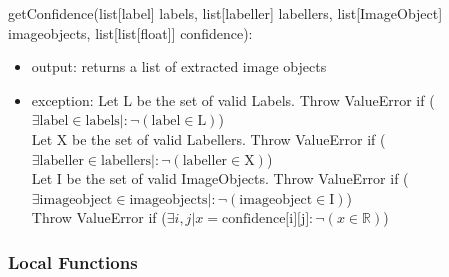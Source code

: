 \documentclass[12pt, titlepage]{article}
\begin{document}
  \noindent getConfidence(list[label] labels, list[labeller] labellers, list[ImageObject] imageobjects, list[list[float]] confidence):
  \begin{itemize}
  \item output: returns a list of extracted image objects
  \item exception: Let L be the set of valid Labels. Throw ValueError if ($\exists \text{label} \in \text{labels} |: \neg (\text{label} \in \text{L})$)\\
  Let X be the set of valid Labellers. Throw ValueError if ($\exists \text{labeller} \in \text{labellers} |: \neg (\text{labeller} \in \text{X})$)\\
  Let I be the set of valid ImageObjects. Throw ValueError if ($\exists \text{imageobject} \in \text{imageobjects} |: \neg (\text{imageobject} \in \text{I})$)\\
  Throw ValueError if ($\exists i,j| x = \text{confidence[i][j]} : \neg (x \in \mathbb{R})$)\\
  \end{itemize}


  
  
  
  \subsubsection{Local Functions}

   
  


\newpage



\end{document}
